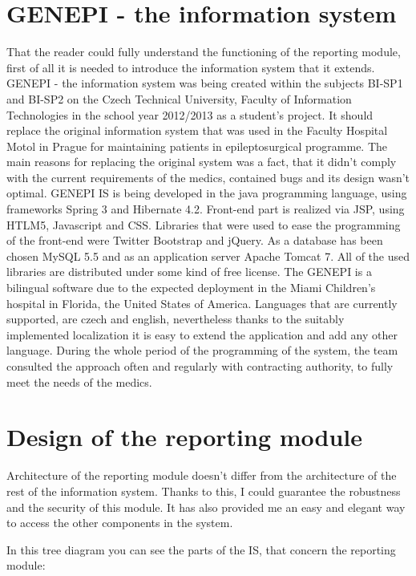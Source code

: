 \documentclass[thesis=B,english]{FITthesis}[2012/10/20]
\begin{document}
\section{GENEPI - the information system}
That the reader could fully understand the functioning of the reporting module, first of all it is needed to introduce the information system that it extends. GENEPI - the information system was being created within the subjects BI-SP1 and BI-SP2 on the Czech Technical University, Faculty of Information Technologies in the school year 2012/2013 as a student's project. It should replace the original information system that was used in the Faculty Hospital Motol in Prague for maintaining patients in epileptosurgical programme. The main reasons for replacing the original system was a fact, that it didn't comply with the current requirements of the medics, contained bugs and its design wasn't optimal. GENEPI IS is being developed in the java programming language, using frameworks Spring 3 and Hibernate 4.2. Front-end part is realized via JSP, using HTLM5, Javascript and CSS. Libraries that were used to ease the programming of the front-end were Twitter Bootstrap and jQuery. As a database has been chosen MySQL 5.5 and as an application server Apache Tomcat 7. All of the used libraries are distributed under some kind of free license. The GENEPI is a bilingual software due to the expected deployment in the Miami Children's hospital in Florida, the United States of America. Languages that are currently supported, are czech and english, nevertheless thanks to the suitably implemented localization it is easy to extend the application and add any other language. During the whole period of the programming of the system, the team consulted the approach often  and regularly with contracting authority, to fully meet the needs of the medics.

\section{Design of the reporting module}
Architecture of the reporting module doesn't differ from the architecture of the rest of the information system. Thanks to this, I could guarantee the robustness and the security of this module. It has also provided me an easy and elegant way to access the other components in the system.



In this tree diagram you can see the parts of the IS, that concern the reporting module:
\end{document}
